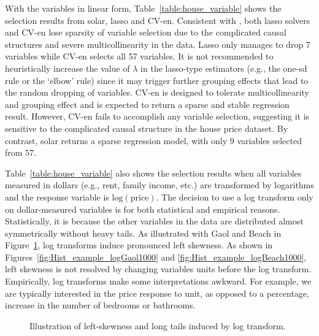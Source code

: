 \documentclass[11pt,review,authoryear]{elsarticle}
\begin{document}
With the variables in linear form, Table~\ref{table:house_variable} shows the selection results from solar, lasso and CV-en. Consistent with \citet{jia2010model}, both lasso solvers and CV-en lose sparsity of variable selection due to the complicated causal structures and severe multicollinearity in the data. Lasso only manages to drop 7 variables while CV-en selects all 57 variables. \textcolor[rgb]{0.00,0.00,1.00}{It is not recommended to heuristically increase the value of $\lambda$ in the lasso-type estimators (e.g., the one-sd rule or the `elbow' rule) since it may trigger further grouping effects that lead to the random dropping of variables.} CV-en is designed to tolerate multicollinearity and grouping effect and is expected to return a sparse and stable regression result. However, CV-en fails to accomplish any variable selection, suggesting it is sensitive to the complicated causal structure in the house price dataset. By contrast, solar returns a sparse regression model, with only $9$ variables selected from $57$.

Table~\ref{table:house_variable} also shows the selection results when all variables measured in dollars (e.g., rent, family income, etc.) are transformed by logarithms and the response variable is $\mathrm{log} \left( \mathrm{price} \right)$. The decision to use a log transform only on dollar-measured variables is for both statistical and empirical reasons. Statistically, it is because the other variables in the data are distributed almost symmetrically without heavy tails. As illustrated with Gaol and Beach in Figure~\ref{fig:Hist_example}, log transforms induce pronounced left skewness. As shown in Figures~\ref{fig:Hist_example_logGaol1000} and \ref{fig:Hist_example_logBeach1000}, left skewness is not resolved by changing variables units before the log transform. Empirically, log transforms make some interpretations awkward. For example, we are typically interested in the price response to unit, as opposed to a percentage, increase in the number of bedrooms or bathrooms.

\begin{figure}[H]
  \centering

  \caption{Illustration of left-skewness and long tails induced by log transform.}
  \label{fig:Hist_example}
\end{figure}
\end{document}
